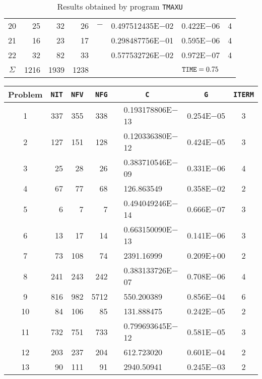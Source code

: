 \documentclass{esub2acm}
\begin{document}
\begin{table}
\begin{tabular}{c|rrrr@{}lcc}
20  &   25  &   32  &   26  &   $-$ &   0.497512435E$-$02   &   0.422E$-$06 &   4   \\
21  &   16  &   23  &   17  &       &   0.298487756E$-$01   &   0.595E$-$06 &   4   \\
22  &   32  &   82  &   33  &       &   0.577532726E$-$02   &   0.972E$-$07 &   4   \\ \hline
$\Sigma$\rule[-2pt]{0pt}{12pt}  &   1216    &   1939    &   1238    &       &       &   ${\tt TIME} = 0.75$ &       \\ \hline
\end{tabular}
\caption{Results obtained by program {\tt TMAXU}}
\label{tmaxu}
\end{table}

\begin{table}
\footnotesize
\centering
\begin{tabular}{c|rrrr@{}lcc} \hline
Problem\rule[-2pt]{0pt}{12pt} & {\tt NIT} & {\tt NFV} & {\tt NFG} & \multicolumn{2}{c}{\tt C} & {\tt G} & {\tt ITERM} \\ \hline
1\rule[-2pt]{0pt}{12pt} &   337 &   355 &   338 &       &   0.193178806E$-$13   &   0.254E$-$05 &   3   \\
2   &   127 &   151 &   128 &       &   0.120336380E$-$12   &   0.424E$-$05 &   3   \\
3   &   25  &   28  &   26  &       &   0.383710546E$-$09   &   0.331E$-$06 &   4   \\
4   &   67  &   77  &   68  &       &   126.863549  &   0.358E$-$02 &   2   \\
5   &   6   &   7   &   7   &       &   0.494049246E$-$14   &   0.666E$-$07 &   3   \\
6   &   13  &   17  &   14  &       &   0.663150090E$-$13   &   0.141E$-$06 &   3   \\
7   &   73  &   108 &   74  &       &   2391.16999  &   0.209E+00   &   2   \\
8   &   241 &   243 &   242 &       &   0.383133726E$-$07   &   0.708E$-$06 &   4   \\
9   &   816 &   982 &   5712&       &   550.200389  &   0.856E$-$04   &   6    \\
10  &   84  &   106 &   85  &       &   131.888475  &   0.242E$-$05 &   2   \\
11  &   732 &   751 &   733 &       &   0.799693645E$-$12   &   0.581E$-$05 &   3   \\
12  &   203 &   237 &   204 &       &   612.723020  &   0.601E$-$04 &   2   \\
13  &   90  &   111 &   91  &       &   2940.50941  &   0.245E$-$03 &   2   \\

\end{tabular}
\end{table}
\end{document}

